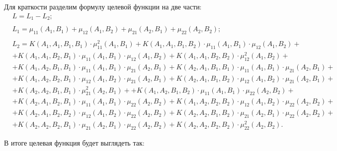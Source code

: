 \documentclass[12pt,a4paper,oneside]{article}
\begin{document}
\par
Для краткости разделим формулу целевой функции на две части:
\mbox{}
\begin{eqnarray*}
& L = L_1 - L_2;\\ \\
& L_1 = \mu_{11}(A_1, B_1) + \mu_{12}(A_1, B_2) + \mu_{21}(A_2, B_1) + \mu_{22}(A_2, B_2);\\ \\
&L_2 = K(A_1, A_1, B_1, B_1) \cdot \mu^{2}_{11}(A_1, B_1)
+ K(A_1, A_1, B_1, B_2) \cdot \mu_{11}(A_1, B_1) \cdot \mu_{12}(A_1, B_2) +\\
&+ K(A_1, A_1, B_2, B_1) \cdot \mu_{11}(A_1, B_1) \cdot \mu_{12}(A_1, B_2)
+ K(A_1, A_1, B_2, B_2) \cdot \mu^{2}_{12}(A_1, B_2) +\\
&+ K(A_1, A_2, B_1, B_1) \cdot \mu_{11}(A_1, B_1) \cdot \mu_{21}(A_2, B_1)
+ K(A_2, A_1, B_1, B_1) \cdot \mu_{11}(A_1, B_1) \cdot \mu_{21}(A_2, B_1) +\\
&+ K(A_1, A_2, B_2, B_1) \cdot \mu_{12}(A_1, B_2) \cdot \mu_{21}(A_2, B_1)
+ K(A_2, A_1, B_1, B_2) \cdot \mu_{12}(A_1, B_2) \cdot \mu_{21}(A_2, B_1) +\\
&+ K(A_2, A_2, B_1, B_1) \cdot \mu^{2}_{21}(A_2, B_1)+
+ K(A_1, A_2, B_1, B_2) \cdot \mu_{11}(A_1, B_1) \cdot \mu_{22}(A_2, B_2)+\\
&+ K(A_2, A_1, B_2, B_1) \cdot \mu_{11}(A_1, B_1) \cdot \mu_{22}(A_2, B_2)
+ K(A_1, A_2, B_2, B_2) \cdot \mu_{12}(A_1, B_2) \cdot \mu_{22}(A_2, B_2) +\\
&+ K(A_2, A_1, B_2, B_2) \cdot \mu_{12}(A_1, B_2) \cdot \mu_{22}(A_2, B_2)
+ K(A_2, A_2, B_1, B_2) \cdot \mu_{21}(A_2, B_1) \cdot \mu_{22}(A_2, B_2) +\\
&+ K(A_2, A_2, B_2, B_1) \cdot \mu_{21}(A_2, B_1) \cdot \mu_{22}(A_2, B_2)
+ K(A_2, A_2, B_2, B_2) \cdot \mu^{2}_{22}(A_2, B_2).
\end{eqnarray*}

\par
В итоге целевая функция будет выглядеть так:
\end{document}
